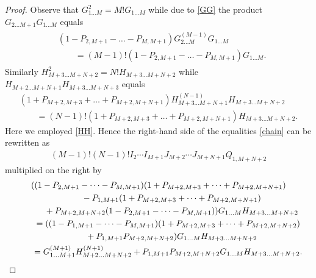 \documentclass[10pt,a4paper]{amsart}
\numberwithin{equation}{section}
\begin{document}
\begin{proof}
Observe that
$G_{1 \dots M}^{2}=M ! G_{1 \dots M}$
while due to \eqref{GG} the product
$G_{2 \dots M+1} G_{1 \dots M}$ equals
\begin{gather*}
\begin{split} &
 ( 1-P_{2,M+1}-\dots-P_{M,M+1} )
G^{(M-1)}_{2 \dots M} G_{1 \dots M}\\
& \qquad {} =(M-1) ! ( 1-P_{2,M+1}-\dots-P_{M,M+1} ) G_{1 \dots M} .
\end{split}
\end{gather*}
Similarly
$H_{M+3 \dots M+N+2}^{2}=N ! H_{M+3 \dots M+N+2}$ while
$H_{M+2 \dots M+N+1} H_{M+3 \dots M+N+3}$ equals
\begin{gather*}
 ( 1+P_{M+2,M+3}+\dots+P_{M+2,M+N+1} )
H^{(N-1)}_{M+3 \dots M+N+1} H_{M+3 \dots M+N+2}\\
\qquad{} =(N-1) ! ( 1+P_{M+2,M+3}+\dots+P_{M+2,M+N+1} )
H_{M+3 \dots M+N+2} .
\end{gather*}
Here we employed \eqref{HH}. Hence the right-hand side of the equalities \eqref{chain}
can be rewritten as
\begin{gather}\label{MN}
(M-1) ! (N-1) !
I_{2} \cdots I_{M+1}
J_{M+2} \cdots J_{M+N+1}
Q_{1,M+N+2}
\end{gather}
multiplied on the right by
\begin{gather}
( ( 1-P_{2,M+1}-\dots-P_{M,M+1} )
( 1+P_{M+2,M+3}+\dots+P_{M+2,M+N+1} )\notag\\
\qquad\quad {} - P_{1,M+1}( 1+P_{M+2,M+3}+\dots+P_{M+2,M+N+1} )\notag\\
\qquad\quad {} +P_{M+2,M+N+2} ( 1-P_{2,M+1}-\dots-P_{M,M+1} ) )
G_{1 \dots M} H_{M+3 \dots M+N+2}\notag\\
\qquad {}= ( ( 1-P_{1,M+1}-\dots-P_{M,M+1} )
( 1+P_{M+2,M+3}+\dots+P_{M+2,M+N+2} )\notag\\
\qquad\quad {}+
P_{1,M+1} P_{M+2,M+N+2} )
G_{1 \dots M} H_{M+3 \dots M+N+2}\notag\\
\qquad{} = G^{(M+1)}_{1 \dots M+1} H^{(N+1)}_{M+2 \dots M+N+2}
+ P_{1,M+1} P_{M+2,M+N+2}
G_{1 \dots M} H_{M+3 \dots M+N+2} .\label{GH}
\end{gather}


\end{proof}
\end{document}
